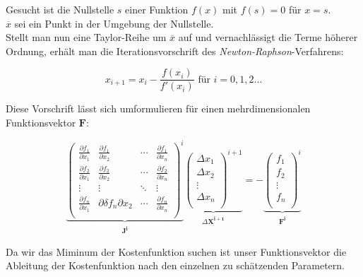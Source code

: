\noindent \tab Gesucht ist die Nullstelle $ s $ einer Funktion $f(x)$ mit $f(s)=0$ für $x=s$. \\
\tab $\overline{x}$ sei ein Punkt in der Umgebung der Nullstelle.\\

Stellt man nun eine Taylor-Reihe um $\overline{x}$ auf und vernachlässigt die Terme höherer Ordnung, erhält man die 
Iterationsvorschrift des \textit{Newton-Raphson}-Verfahrens:

 \begin{equation}
	x_{i+1} = x_{i} - \frac{f(x_{i})}{f'(x_{i})} \text{ für }i=0,1,2...
	\label{eq:Newton_Raphson}
\end{equation}  

Diese Vorschrift lässt sich umformulieren für einen mehrdimensionalen Funktionsvektor $\mathbf{F}$:

 \begin{equation}
	\underbrace{\begin{pmatrix}
	\frac{\partial f_{1}}{\partial x_{1}} & \frac{\partial f_{1}}{\partial x_{2}} & \cdots & \frac{\partial f_{1}}    		
	{\partial x_{n}}\\
	\frac{\partial f_{2}}{\partial x_{1}} & \frac{\partial f_{2}}{\partial x_{2}} & \cdots & \frac{\partial f_{2}}			
	{\partial x_{n}}\\
	\vdots & \vdots & \ddots & \vdots\\
	\frac{\partial f_{n}}{\partial x_{1}} & \partial{\delta f_{n}}{\partial x_{2}} & \cdots & \frac{\partial f_{n}}			
	{\partial x_{n}}\\
	\end{pmatrix}^{i}}_{\substack{\mathbf{J^{i}}}}
	\underbrace{\begin{pmatrix}
	\Delta x_{1}\\
	\Delta x_{2}\\
	\vdots\\
	\Delta x_{n}\\
	\end{pmatrix}^{i+1}}_{\substack{\Delta \mathbf{X^{i+1}}}} = -
	\underbrace{\begin{pmatrix}
	f_{1}\\
	f_{2}\\
	\vdots\\
	f_{n}\\
	\end{pmatrix}^{i}}_{\substack{\mathbf{F^{i}}}}
	\label{eq:Newton_Raphson_MIMO}
\end{equation} 

Da wir das Miminum der Kostenfunktion suchen ist unser Funktionsvektor die Ableitung der Kostenfunktion nach den einzelnen zu schätzenden Parametern. 

